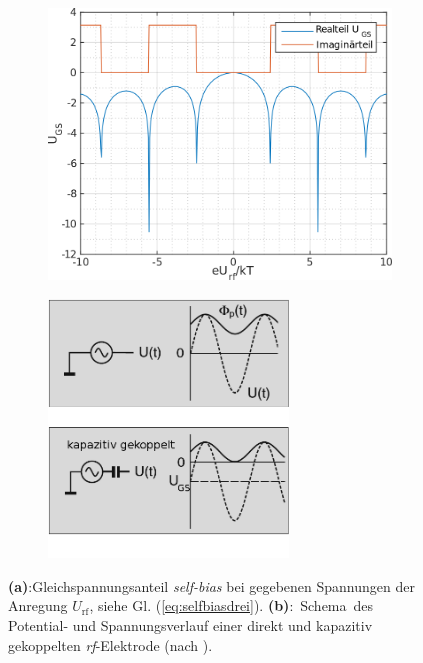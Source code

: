 \documentclass[numbers=noenddot,a4paper]{scrartcl}
\newcommand{\ix}[1]{_\text{#1}}
\newcommand{\tilt}[1]{\textit{#1}}
\newcommand{\fett}[1]{\textbf{#1}}
\begin{document}
						\begin{figure}
							\centering
								\begin{subfigure}[t]{0.45\textwidth}
									\centering
									\includegraphics[width=\textwidth,height=0.8\textwidth]{figs/selfbiasselbst.png}
									\caption{}
									\label{img:imagundreal}
								\end{subfigure}
								\begin{subfigure}[t]{0.45\textwidth}
									\centering
									\includegraphics[width=0.7\textwidth,height=0.7\textwidth]{figs/kapazitivekopplungohneschemapiel.png}
									\vspace{-0.1cm}
									\caption{}
									\label{img:kapazitivgekoppelt}
								\end{subfigure}
								\caption{\fett{(a)}:Gleichspannungsanteil \tilt{self-bias} bei gegebenen Spannungen der Anregung $U\ix{rf}$, siehe Gl. (\ref{eq:selfbiasdrei}). \mbox{\fett{(b)}: Schema des} Potential- und Spannungsverlauf einer direkt und kapazitiv gekoppelten \tilt{rf}-Elektrode (nach \cite{Piel10}).}
						\end{figure}
\end{document}
